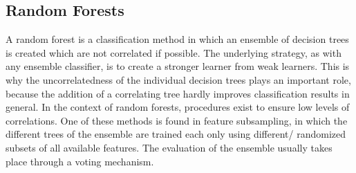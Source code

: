 \subsection{Random Forests}\label{subsec:random_forests}

A random forest is a classification method in which an ensemble of decision trees is created which are not correlated if possible. The underlying strategy, as with any ensemble classifier, is to create a stronger learner from weak learners. This is why the uncorrelatedness of the individual decision trees plays an important role, because the addition of a correlating tree hardly improves classification results in general. In the context of random forests, procedures exist to ensure low levels of correlations. One of these methods is found in feature subsampling, in which the different trees of the ensemble are trained each only using different/ randomized subsets of all available features. The evaluation of the ensemble usually takes place through a voting mechanism. \cite{Jiang}

